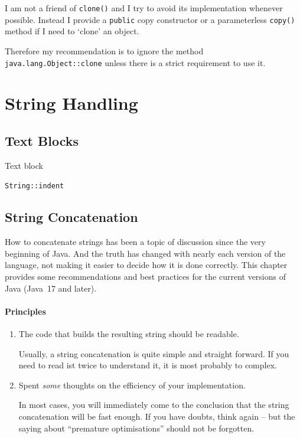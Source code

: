 I am not a friend of \lstinline|clone()| and I try to avoid its implementation whenever possible. Instead I provide a \lstinline|public| copy constructor or a parameterless \lstinline|copy()| method if I need to ‘clone’ an object.

Therefore my recommendation is to ignore the method \lstinline|java.lang.Object::clone| unless there is a strict requirement to use it.

\chapter{String Handling}\label{sec:StringHandling}

\section{Text Blocks}\label{sec:TextBlocks}
Text block

\lstinline|String::indent| \autocite{ORACLE_DOC_STRING:indent}
\autocite{ORACLE_DOC_STRING_CLASS}

\section{String Concatenation}
How to concatenate strings has been a topic of discussion since the very beginning of Java. And the truth has changed with nearly each version of the language, not making it easier to decide how it is done correctly. This chapter provides some recommendations and best practices for the current versions of Java (Java~17 and later).


\subsubsection{Principles}
\begin{enumerate}[label=P\arabic*.]
\item{The code that builds the resulting string should be readable.

Usually, a string concatenation is quite simple and straight forward. If you need to read ist twice to understand it, it is most probably to complex.}

\item{Spent \textit{some} thoughts on the efficiency of your implementation.

In most cases, you will immediately come to the conclusion that the string concatenation will be fast enough. If you have doubts, think again – but the saying about “premature optimisations”\autocite{Knuth:PrematureOptimization} should not be forgotten.}
\end{enumerate}

